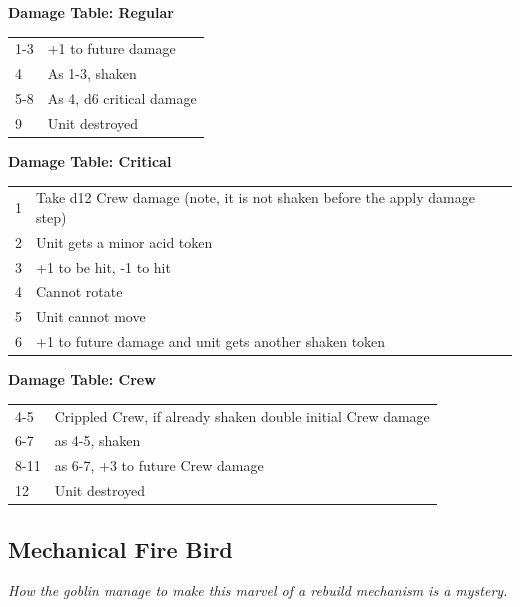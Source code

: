 \documentclass[a4paper,12pt]{article}
\begin{document}
\noindent\textbf{Damage Table: Regular}

\begin{tabular}{@{}lp{}@{}}
1-3 & +1 to future damage \\
4 & As 1-3, shaken \\
5-8 & As 4, d6 critical damage \\
9 & Unit destroyed \\
\end{tabular}
\vspace{1ex}

\noindent\textbf{Damage Table: Critical}

\begin{tabular}{@{}lp{}@{}}
1 & Take d12 Crew damage (note, it is not shaken before the apply damage step) \\
2 & Unit gets a minor acid token \\
3 & +1 to be hit, -1 to hit \\
4 & Cannot rotate \\
5 & Unit cannot move \\
6 & +1 to future damage and unit gets another shaken token \\
\end{tabular}
\vspace{1ex}

\noindent\textbf{Damage Table: Crew}

\begin{tabular}{@{}lp{}@{}}
4-5 & Crippled Crew, if already shaken double initial Crew damage \\
6-7 & as 4-5, shaken \\
8-11 & as 6-7, +3 to future Crew damage \\
12 & Unit destroyed \\
\end{tabular}
\vspace{1ex}
\subsection{Mechanical Fire Bird}
\label{unit-mechanical-fire-bird}

\textit{How the goblin manage to make this marvel of a rebuild mechanism is a mystery.}
\end{document}
